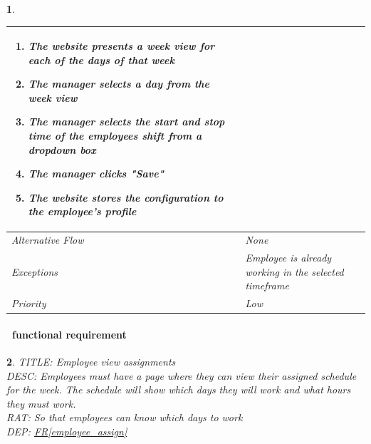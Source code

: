 \documentclass{scrreprt}
\theoremstyle{funreq}
\newtheorem{funreq}{}
\newcommand*{\reqref}[1]{\hyperref[#1]{FR\ref*{#1}}}
\begin{document}
\begin{funreq}
\begin{table}[H]
{\begin{tabularx}{\columnwidth}{|l|X|}
\begin{enumerate}
    					\item The website presents a week view for each of the days of that week
    					\item The manager selects a day from the week view
    					\item The manager selects the start and stop time of the employees shift from a dropdown box
    					\item The manager clicks "Save"
    					\item The website stores the configuration to the employee's profile
					\end{enumerate}
					\\ \hline Alternative Flow & 
					None
					\\ \hline Exceptions & 
					Employee is already working in the selected timeframe
					\\ \hline Priority & 
					Low
					\\ \hline
				\end{tabularx}%
			}
		\end{table}
	\end{funreq}
	
	\paragraph[]{\Subsectionname ~functional requirement }
	\begin{funreq}
		\label{employee_viewwork}
		TITLE: Employee view assignments\\
		DESC: Employees must have a page where they can view their assigned schedule for the week.  The schedule will show which days they will work and what hours they must work.\\
		RAT: So that employees can know which days to work\\
		DEP: \reqref{employee_assign}
	\end{funreq}
	
\end{document}
